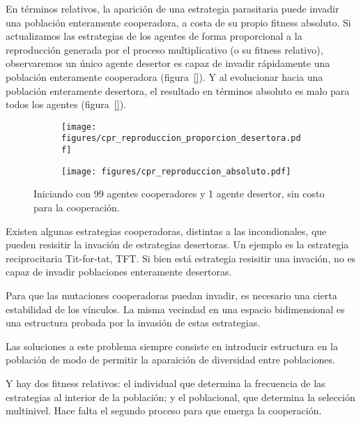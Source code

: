 \documentclass[a4paper,10pt]{article}
\begin{document}

En términos relativos, la aparición de una estrategia parasitaria puede invadir una población enteramente cooperadora, a costa de su propio fitness absoluto.
Si actualizamos las estrategias de los agentes de forma proporcional a la reproducción generada por el proceso multiplicativo (o su fitness relativo), observaremos un único agente desertor es capaz de invadir rápidamente una población enteramente cooperadora (figura~\ref{}).
Y al evolucionar hacia una población enteramente desertora, el resultado en términos absoluto es malo para todos los agentes (figura~\ref{}).

\begin{figure}[H]
    \centering
    \begin{subfigure}[b]{0.45\textwidth}
    \texttt{[image: figures/cpr\_reproduccion\_proporcion\_desertora.pdf]}
    \end{subfigure}
    \begin{subfigure}[b]{0.45\textwidth}
    \texttt{[image: figures/cpr\_reproduccion\_absoluto.pdf]}
    \end{subfigure}
    \caption{Iniciando con 99 agentes cooperadores y 1 agente desertor, sin costo para la cooperación.}
    \label{fig:cpr_cooperation_zoom}
\end{figure}


Existen algunas estrategias cooperadoras, distintas a las incondionales, que pueden resisitir la invación de estrategias desertoras.
Un ejemplo es la estrategia reciprocitaria Tit-for-tat, TFT.
Si bien está estrategia resisitir una invación, no es capaz de invadir poblaciones enteramente desertoras.


Para que las mutaciones cooperadoras puedan invadir, es necesario una cierta estabilidad de los vínculos.
La misma vecindad en una espacio bidimensional es una estructura probada por la invasión de estas estrategias.



Las soluciones a este problema siempre consiste en introducir estructura en la población de modo de permitir la aparaición de diversidad entre poblaciones.

% 

Y hay dos fitness relativos: el individual que determina la frecuencia de las estrategias al interior de la población; y el poblacional, que determina la selección multinivel. Hace falta el segundo proceso para que emerga la cooperación.
\end{document}
